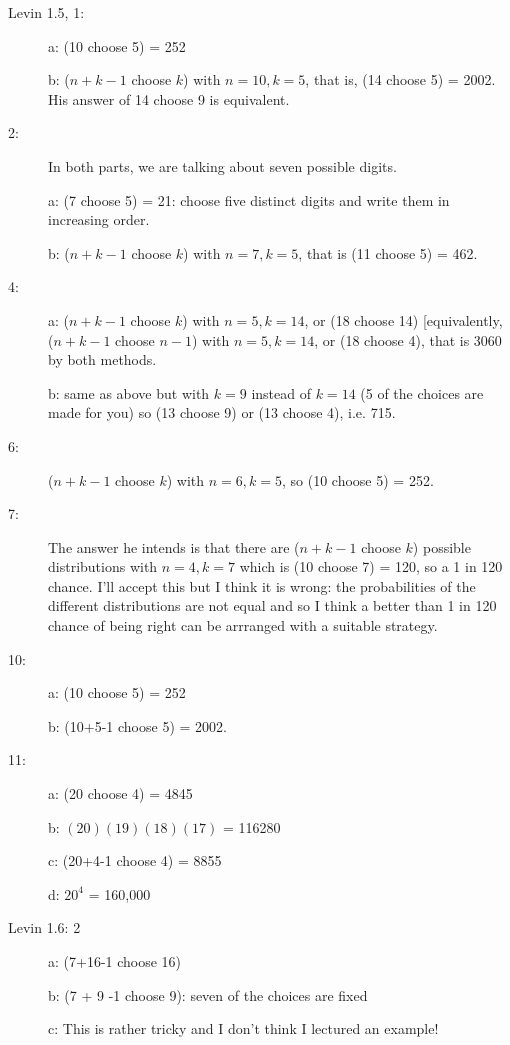 \documentclass[12pt]{article}
\begin{document}
\begin{description}

\item[Levin 1.5, 1:]  a:  (10 choose 5) = 252

b:  ($n+k-1$ choose $k$) with $n=10, k=5$, that is, (14 choose 5) = 2002.  His answer of 14 choose 9 is equivalent.

\item[2:]   In both parts, we are talking about seven possible digits.

a:  (7 choose 5) = 21:  choose five distinct digits and write them in increasing order.

b:  ($n+k-1$ choose $k$) with $n=7, k=5$, that is (11 choose 5) = 462.

\item[4:]  a:  ($n+k-1$ choose $k$) with $n=5, k=14$, or (18 choose 14) [equivalently, ($n+k-1$ choose $n-1$) with $n=5,k=14$, or (18 choose 4), that is 3060 by both methods.

b:  same as above but with $k=9$ instead of $k=14$ (5 of the choices are made for you) so
(13 choose 9) or (13 choose 4), i.e. 715.

\item[6:]  ($n+k-1$ choose $k$) with $n=6, k=5$, so (10 choose 5) = 252.

\item[7:]  The answer he intends is that there are ($n+k-1$ choose $k$) possible distributions with $n=4, k=7$ which is (10 choose 7) = 120, so a 1 in 120 chance.  I'll accept this but I think it is wrong:  the probabilities of the different distributions are not equal and so I think a better than 1 in 120 chance of being right can be arrranged with a suitable strategy.

\item[10:]  a:  (10 choose 5) = 252

b: (10+5-1 choose 5) = 2002.

\item[11:]  a:  (20 choose 4) = 4845

b:  $(20)(19)(18)(17)$ = 116280

c:  (20+4-1 choose 4)  = 8855

d:  $20^4$ = 160,000

\item[Levin 1.6: 2]  a:  (7+16-1 choose 16)

b:  (7 + 9 -1 choose 9):  seven of the choices are fixed

c:  This is rather tricky and I don't think I lectured an example!


\end{description}
\end{document}
